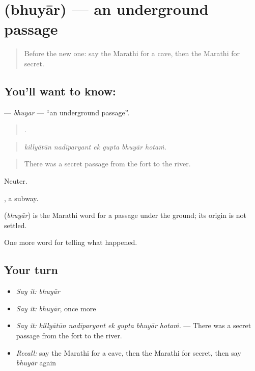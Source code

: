 \section[\texorpdfstring{\mr{भुयार} (bhuyār)}{भुयार (bhuyār)}]{ (bhuyār) — an underground passage}

\label{lesson:MR-C336-bhuyar}



\begin{quote}
Before the new one: say the Marathi for a cave, then the Marathi for secret.
\end{quote}

\subsection*{You'll want to know: }
\textbf{} — \emph{bhuyār} — \textquotedblleft{}an underground passage\textquotedblright{}.

\begin{quote}
     .
\end{quote}

\begin{quote}
\emph{killyātūn nadīparyant ek gupta bhuyār hotaṁ.}
\end{quote}

\begin{quote}
There was a secret passage from the fort to the river.
\end{quote}

Neuter.

 , a subway.

\begin{cousinweb}
\textbf{} (\emph{bhuyār}) is the Marathi word for a passage under the ground; its origin is not settled.
\end{cousinweb}

\begin{grammarlens}[title={What you've built}]
One more word for telling what happened.
\end{grammarlens}

\subsection*{Your turn}
\begin{itemize}
\raggedright
  \item \emph{Say it:} \emph{bhuyār}
  \item \emph{Say it:} \emph{bhuyār}, once more
  \item \emph{Say it:} \emph{killyātūn nadīparyant ek gupta bhuyār hotaṁ.} — There was a secret passage from the fort to the river.
  \item \emph{Recall:} say the Marathi for a cave, then the Marathi for secret, then say \emph{bhuyār} again
\end{itemize}


